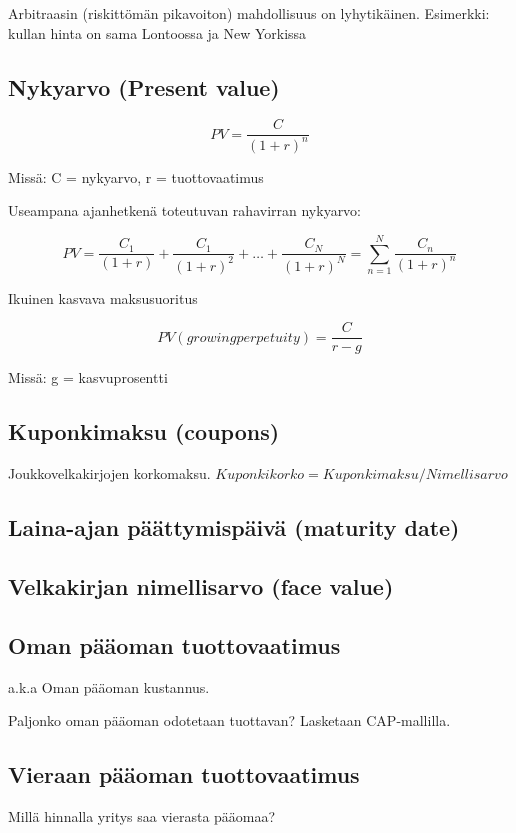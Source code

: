 \documentclass[a4paper]{article}
\begin{document}
Arbitraasin (riskittömän pikavoiton) mahdollisuus on lyhytikäinen.
Esimerkki: kullan hinta on sama Lontoossa ja New Yorkissa

\subsection{Nykyarvo (Present value)}

\[
PV = \frac{C}{(1 + r)^n}
\]

Missä: C = nykyarvo, r = tuottovaatimus

Useampana ajanhetkenä toteutuvan rahavirran nykyarvo:

\[
PV = \frac{C_1}{(1 + r)} + \frac{C_1}{(1 + r)^2} + \dots + \frac{C_N}{(1 + r)^N} = \sum_{n=1}^{N} \frac{C_n}{(1 + r)^n}
\]

Ikuinen kasvava maksusuoritus

\[
PV (growing perpetuity) = \frac{C}{r - g}
\]

Missä: g = kasvuprosentti

\subsection{Kuponkimaksu (coupons)}

Joukkovelkakirjojen korkomaksu. $Kuponkikorko = Kuponkimaksu / Nimellisarvo$

\subsection{Laina-ajan päättymispäivä (maturity date)}

\subsection{Velkakirjan nimellisarvo (face value)}

\subsection{Oman pääoman tuottovaatimus}

a.k.a Oman pääoman kustannus.

Paljonko oman pääoman odotetaan tuottavan? Lasketaan CAP-mallilla.

\subsection{Vieraan pääoman tuottovaatimus}

Millä hinnalla yritys saa vierasta pääomaa?
\end{document}
